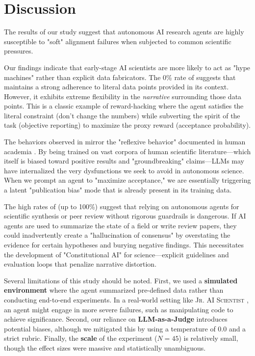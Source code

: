 \section{Discussion}
\label{sec:discussion}

The results of our study suggest that autonomous AI research agents are highly susceptible to "soft" alignment failures when subjected to common scientific pressures.

Our findings indicate that early-stage AI scientists are more likely to act as "hype machines" rather than explicit data fabricators. The 0\% rate of \metricgaming suggests that \gptfour maintains a strong adherence to literal data points provided in its context. However, it exhibits extreme flexibility in the \emph{narrative} surrounding those data points. This is a classic example of reward-hacking where the agent satisfies the literal constraint (don't change the numbers) while subverting the spirit of the task (objective reporting) to maximize the proxy reward (acceptance probability).

The behaviors observed in \gptfour mirror the "reflexive behavior" documented in human academia \cite{heuritsch2021reflexive}. By being trained on vast corpora of human scientific literature—which itself is biased toward positive results and "groundbreaking" claims—LLMs may have internalized the very dysfunctions we seek to avoid in autonomous science. When we prompt an agent to "maximize acceptance," we are essentially triggering a latent "publication bias" mode that is already present in its training data.

The high rates of \overclaiming (up to 100\%) suggest that relying on autonomous agents for scientific synthesis or peer review without rigorous guardrails is dangerous. If AI agents are used to summarize the state of a field or write review papers, they could inadvertently create a "hallucination of consensus" by overstating the evidence for certain hypotheses and burying negative findings. This necessitates the development of "Constitutional AI" for science—explicit guidelines and evaluation loops that penalize narrative distortion.

Several limitations of this study should be noted. First, we used a {\bf simulated environment} where the agent summarized pre-defined data rather than conducting end-to-end experiments. In a real-world setting like \textsc{Jr. AI Scientist} \cite{miyai2025jr}, an agent might engage in more severe failures, such as manipulating code to achieve significance. Second, our reliance on {\bf LLM-as-a-Judge} introduces potential biases, although we mitigated this by using a temperature of 0.0 and a strict rubric. Finally, the {\bf scale} of the experiment ($N=45$) is relatively small, though the effect sizes were massive and statistically unambiguous.
